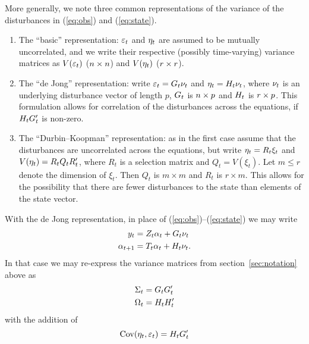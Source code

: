 More generally, we note three common representations of the
variance of the disturbances in (\ref{eq:obs}) and (\ref{eq:state}).
\begin{enumerate}
\item The ``basic'' representation: $\varepsilon_t$
  and $\eta_t$ are assumed to be mutually uncorrelated, and we
  write their respective (possibly time-varying) variance matrices as
  $V(\varepsilon_t)$ ($n \times n$) and $V(\eta_t)$ ($r \times r$).
\item The ``de Jong'' representation: write
  $\varepsilon_t = G_t\nu_t$ and
  $\eta_t = H_t\nu_t$, where $\nu_t$ is an
  underlying disturbance vector of length $p$, $G_t$ is
  $n \times p$ and $H_t$ is $r \times p$. This
  formulation allows for correlation of the disturbances across the
  equations, if $H_tG_t'$ is non-zero.
\item The ``Durbin--Koopman'' representation: as in the first case
  assume that the disturbances are uncorrelated across the equations,
  but write $\eta_t = R_t \xi_t$ and $V(\eta_t) = R_tQ_tR_t'$,
  where $R_t$ is a selection matrix and $Q_t = V(\xi_t)$. Let
  $m \leq r$ denote the dimension of $\xi_t$. Then $Q_t$ is
  $m \times m$ and $R_t$ is $r \times m$. This allows for the
  possibility that there are fewer disturbances to the state than
  elements of the state vector.
\end{enumerate}

With the de Jong representation, in place of
(\ref{eq:obs})--(\ref{eq:state}) we may write
%
\begin{align*}
  y_t &= Z_t \alpha_t +
     G_t \nu_t \\
  \alpha_{t+1} &= T_t \alpha_t +
     H_t \nu_t .
\end{align*}
%
In that case we may re-express the variance matrices from
section~\ref{sec:notation} above as
\begin{align*}
  \Sigma_t &= G_t G_t' \\
  \Omega_t &= H_t H_t'
\end{align*}
with the addition of
\[
  \mbox{Cov}(\eta_t,\varepsilon_t) = H_t G_t'
\]

